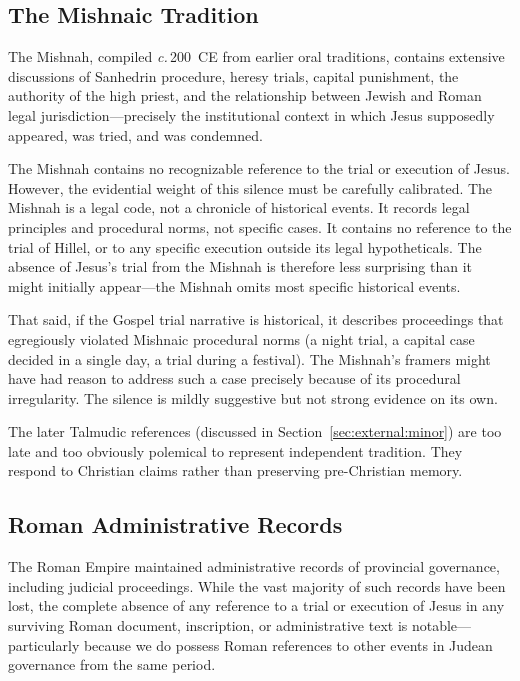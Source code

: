 \documentclass[12pt,oneside]{article}
\newcommand{\circa}{\textit{c.}\,}
\begin{document}
\subsection{The Mishnaic Tradition}
\label{sec:silence:mishnah}

The Mishnah, compiled \circa 200~CE from earlier oral traditions,
contains extensive discussions of Sanhedrin procedure, heresy trials,
capital punishment, the authority of the high priest, and the
relationship between Jewish and Roman legal jurisdiction---precisely
the institutional context in which Jesus supposedly appeared, was tried,
and was condemned.

The Mishnah contains no recognizable reference to the trial or
execution of Jesus.  However, the evidential weight of this silence must
be carefully calibrated.  The Mishnah is a legal code, not a chronicle
of historical events.  It records legal principles and procedural norms,
not specific cases.  It contains no reference to the trial of Hillel,
or to any specific execution outside its legal hypotheticals.  The
absence of Jesus's trial from the Mishnah is therefore less surprising
than it might initially appear---the Mishnah omits most specific
historical events.

That said, if the Gospel trial narrative is historical, it describes
proceedings that egregiously violated Mishnaic procedural norms (a night
trial, a capital case decided in a single day, a trial during a
festival).  The Mishnah's framers might have had reason to address such
a case precisely because of its procedural irregularity.  The silence
is mildly suggestive but not strong evidence on its own.

The later Talmudic references (discussed in
Section~\ref{sec:external:minor}) are too late and too obviously
polemical to represent independent tradition.  They respond to
Christian claims rather than preserving pre-Christian memory.

\subsection{Roman Administrative Records}
\label{sec:silence:roman}

The Roman Empire maintained administrative records of provincial
governance, including judicial proceedings.  While the vast majority of
such records have been lost, the complete absence of any reference to a
trial or execution of Jesus in any surviving Roman document, inscription,
or administrative text is notable---particularly because we do possess
Roman references to other events in Judean governance from the same
period.
\end{document}
